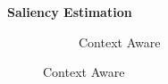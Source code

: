 \begin{frame}{\textbf{Saliency Estimation}}
\begin{figure}
{\begin{minipage}{.45\textwidth}
\begin{subfigure}[c]{\textwidth}
			\caption{Context Aware}
		\end{subfigure}
	\end{minipage}}
\end{figure}
\end{frame}


